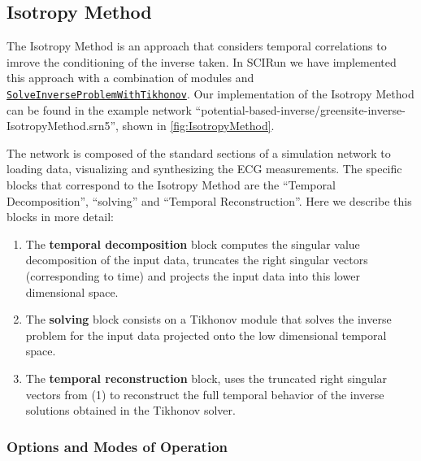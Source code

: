     
   
\subsection{Isotropy Method}
    
    The Isotropy Method is an approach that considers temporal correlations to imrove the conditioning of the inverse taken. 
    In SCIRun we have implemented this approach with a combination of modules and \href{http://scirundocwiki.sci.utah.edu/SCIRunDocs/index.php/CIBC:Documentation:SCIRun:Reference:BioPSE:SolveInverseProblemWithTikhonov}{{\tt SolveInverseProblemWithTikhonov}}.
    Our implementation of the Isotropy Method can be found in the example network ``potential-based-inverse/greensite-inverse-IsotropyMethod.srn5'', shown in \autoref{fig:IsotropyMethod}.
    
    The network is composed of the standard sections of a simulation network to loading data, visualizing and synthesizing the ECG measurements. 
    The specific blocks that correspond to the Isotropy Method are the ``Temporal Decomposition'', ``solving'' and ``Temporal Reconstruction''. Here we describe this blocks in more detail:
    \begin{enumerate}
        \item The {\bf temporal decomposition} block computes the singular value decomposition of the input data, truncates the right singular vectors (corresponding to time) and projects the input data into this lower dimensional space.
        \item The {\bf solving } block consists on a Tikhonov module that solves the inverse problem for the input data projected onto the low dimensional temporal space.
        \item The {\bf temporal reconstruction} block, uses the truncated right singular vectors from (1) to reconstruct the full temporal behavior of the inverse solutions obtained in the Tikhonov solver.
    \end{enumerate}

    \subsubsection{Options and Modes of Operation}
    
